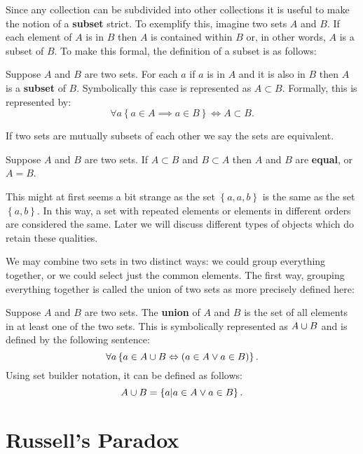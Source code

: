 Since any collection can be subdivided into other collections it is useful to make the notion of a \textbf{subset} strict.
To exemplify this, imagine two sets $A$ and $B$.
If each element of $A$ is in $B$ then $A$ is contained within $B$ or, in other words, $A$ is a subset of $B$.
To make this formal, the definition of a subset is as follows:
\begin{defn}
\label{set:subset:defn}
  Suppose $A$ and $B$ are two sets.
  For each $a$ if $a$ is in $A$ and it is also in $B$ then $A$ is a \textbf{subset} of $B$.
  Symbolically this case is represented as $A \subset B$.
  Formally, this is represented by:
  $$
    \forall a \left\{ a \in A \implies a \in B \right\}  \Leftrightarrow A \subset B.
  $$
\end{defn}

If two sets are mutually subsets of each other we say the sets are equivalent.
\begin{defn}
\label{set:subset:equality:defn}
  Suppose $A$ and $B$ are two sets.
  If $A \subset B$ and $B \subset A$ then $A$ and $B$ are \textbf{equal}, or $A = B$.
\end{defn}
This might at first seems a bit strange as the set $\left\{ a, a, b\right\}$ is the same as the set $\left\{ a, b \right\}$.
In this way, a set with repeated elements or elements in different orders are considered the same.
Later we will discuss different types of objects which do retain these qualities.

We may combine two sets in two distinct ways: we could group everything together, or we could select just the common elements.
The first way, grouping everything together is called the union of two sets as more precisely defined here:
\begin{defn}
\label{set:union:defn}
  Suppose $A$ and $B$ are two sets.
  The \textbf{union} of $A$ and $B$ is the set of all elements in at least one of the two sets.
  This is symbolically represented as $A \cup B$ and is defined by the following sentence:
  $$
  \forall a \left\{ a \in A \cup B \Leftrightarrow (a \in A \vee a \in B) \right\}.
  $$
  Using set builder notation, it can be defined as follows:
  $$
    A \cup B =  \left\{ a | a \in A \vee a \in B \right\}.
  $$
\end{defn}



\section{Russell's Paradox}
